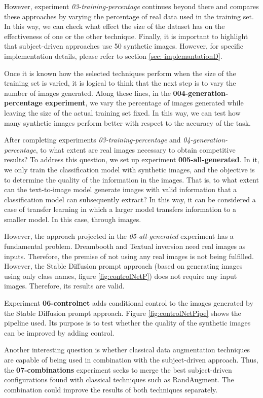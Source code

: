 However, experiment \textit{03-training-percentage} continues beyond there and compares these approaches by varying the percentage of real data used in the training set. In this way, we can check what effect the size of the dataset has on the effectiveness of one or the other technique. Finally, it is important to highlight that subject-driven approaches use 50 synthetic images. However, for specific implementation details, please refer to section \ref{sec: implemantationD}.

Once it is known how the selected techniques perform when the size of the training set is varied, it is logical to think that the next step is to vary the number of images generated. Along these lines, in the \textbf{004-generation-percentage experiment}, we vary the percentage of images generated while leaving the size of the actual training set fixed. In this way, we can test how many synthetic images perform better with respect to the accuracy of the task.

After completing experiments \textit{03-training-percentage} and \textit{04-generation-percentage}, to what extent are real images necessary to obtain competitive results? To address this question, we set up experiment \textbf{005-all-generated}. In it, we only train the classification model with synthetic images, and the objective is to determine the quality of the information in the images. That is, to what extent can the text-to-image model generate images with valid information that a classification model can subsequently extract? In this way, it can be considered a case of transfer learning in which a larger model transfers information to a smaller model. In this case, through images.

However, the approach projected in the \textit{05-all-generated} experiment has a fundamental problem. Dreambooth and Textual inversion need real images as inputs. Therefore, the premise of not using any real images is not being fulfilled. However, the Stable Diffusion prompt approach (based on generating images using only class names, figure \ref{fig:controlNetP}) does not require any input images. Therefore, its results are valid.

Experiment \textbf{06-controlnet} adds conditional control to the images generated by the Stable Diffusion prompt approach. Figure \ref{fig:controlNetPipe} shows the pipeline used. Its purpose is to test whether the quality of the synthetic images can be improved by adding control.

Another interesting question is whether classical data augmentation techniques are capable of being used in combination with the subject-driven approach. Thus, the \textbf{07-combinations} experiment seeks to merge the best subject-driven configurations found with classical techniques such as RandAugment. The combination could improve the results of both techniques separately. 


